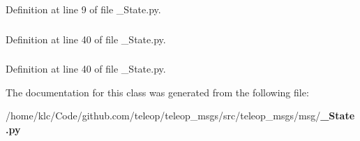Definition at line 9 of file \_\-State.py.

\subsubsection[{axes}]{}\label{classteleop__msgs_1_1msg_1_1__State_1_1State_a284387e30d6eeab18949861d4b87f4a5}


Definition at line 40 of file \_\-State.py.

\subsubsection[{buttons}]{}\label{classteleop__msgs_1_1msg_1_1__State_1_1State_af9e38d06de89ebed6c46a1f64e99d64a}


Definition at line 40 of file \_\-State.py.



The documentation for this class was generated from the following file:\begin{DoxyCompactItemize}
\item 
/home/klc/Code/github.com/teleop/teleop\_\-msgs/src/teleop\_\-msgs/msg/{\bf \_\-State.py}\end{DoxyCompactItemize}
